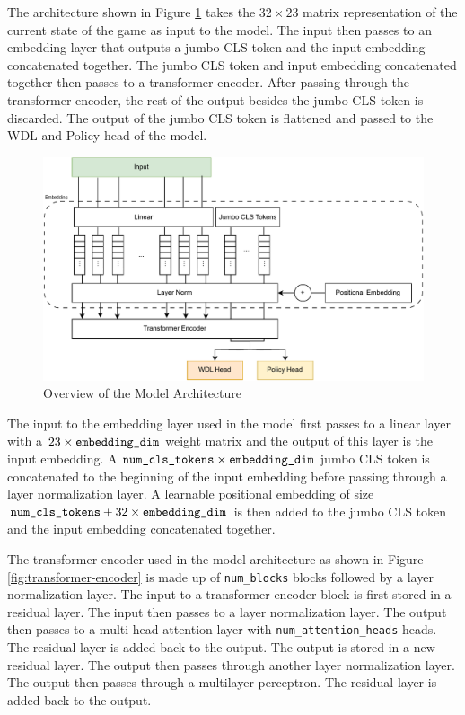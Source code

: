 The architecture shown in Figure \ref{fig:jumbo-vit} takes the $32 \times 23$ matrix representation of the current state of the game as input to the model. The input then passes to an embedding layer that outputs a jumbo CLS token and the input embedding concatenated together. The jumbo CLS token and input embedding concatenated together then passes to a transformer encoder. After passing through the transformer encoder, the rest of the output besides the jumbo CLS token is discarded. The output of the jumbo CLS token is flattened and passed to the WDL and Policy head of the model.

\begin{figure}[H]
    \centering
    \includegraphics[width=\linewidth]{images/JumboViT.pdf}
    \caption{Overview of the Model Architecture}
    \label{fig:jumbo-vit}
\end{figure}

The input to the embedding layer used in the model first passes to a linear layer with a $23 \times \verb|embedding_dim|$ weight matrix and the output of this layer is the input embedding. A $\verb|num_cls_tokens| \times \verb|embedding_dim|$ jumbo CLS token is concatenated to the beginning of the input embedding before passing through a layer normalization layer. A learnable positional embedding of size $\verb|num_cls_tokens| + 32 \times \verb|embedding_dim|$ is then added to the jumbo CLS token and the input embedding concatenated together.

The transformer encoder used in the model architecture as shown in Figure \ref{fig:transformer-encoder} is made up of \verb|num_blocks| blocks followed by a layer normalization layer. The input to a transformer encoder block is first stored in a residual layer. The input then passes to a layer normalization layer. The output then passes to a multi-head attention layer with \verb|num_attention_heads| heads. The residual layer is added back to the output. The output is stored in a new residual layer. The output then passes through another layer normalization layer. The output then passes through a multilayer perceptron. The residual layer is added back to the output. 

